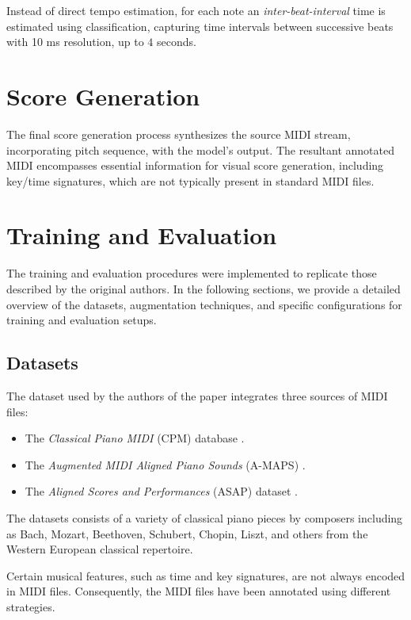 Instead of direct tempo estimation, for each note an \emph{inter-beat-interval} time is estimated using classification, capturing time intervals between successive beats with 10 ms resolution, up to $4$ seconds.

\section{Score Generation}

The final score generation process synthesizes the source MIDI stream, incorporating pitch sequence, with the model's output. The resultant annotated MIDI encompasses essential information for visual score generation, including key/time signatures, which are not typically present in standard MIDI files.

\section{Training and Evaluation}

The training and evaluation procedures were implemented to replicate those described by the original authors. In the following sections, we provide a detailed overview of the datasets, augmentation techniques, and specific configurations for training and evaluation setups.

\subsection{Datasets}\label{datasets}

The dataset used by the authors of the paper \cite{Liu2022} integrates three sources of MIDI files: \begin{itemize}
	\item The \emph{Classical Piano MIDI} (CPM) database \cite{Krueger1996}.
	\item The \emph{Augmented MIDI Aligned Piano Sounds} (A-MAPS) \cite{Ycart2018}.
	\item The \emph{Aligned Scores and Performances} (ASAP) dataset \cite{Foscarin2020}.
\end{itemize}

The datasets consists of a variety of classical piano pieces by composers including as Bach, Mozart, Beethoven, Schubert, Chopin, Liszt, and others from the Western European classical repertoire.

Certain musical features, such as time and key signatures, are not always encoded in MIDI files. Consequently, the MIDI files have been annotated using different strategies.

